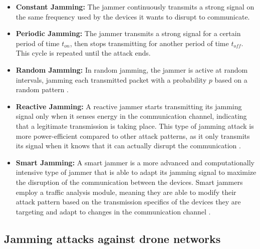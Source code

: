 \documentclass[futureinternet,article,submit,pdftex,moreauthors]{Definitions/mdpi}
\begin{document}
\begin{itemize}
    \item \textbf{Constant Jamming:} The jammer continuously transmits a strong signal on the same frequency used by the devices it wants to disrupt to communicate. 
    \item \textbf{Periodic Jamming:} The jammer transmits a strong signal for a certain period of time \(t_{on}\), then stops transmitting for another period of time \(t_{off}\). This cycle is repeated until the attack ends.
    \item \textbf{Random Jamming:} In random jamming, the jammer is active at random intervals, jamming each transmitted packet with a probability 
    \(p\) based on a random pattern \cite{VANETsAI-Lyamin}. 
    \item \textbf{Reactive Jamming:} A reactive jammer starts transmitting its jamming signal only when it senses energy in the communication channel, 
    indicating that a legitimate transmission is taking place. This type of jamming attack is more power-efficient compared to other 
    attack patterns, as it only transmits its signal when it knows that it can actually disrupt the communication \cite{MLMisbehavior5GBoualouache}.
    \item \textbf{Smart Jamming:} A smart jammer is a more advanced and computationally intensive type of jammer that is able to adapt its jamming signal to 
    maximize the disruption of the communication between the devices. Smart jammers employ a traffic analysis module, meaning they are able to modify their attack pattern based on the 
    transmission specifics of the devices they are targeting and adapt to changes in the communication channel \cite{AntiJammingV2V-Feng}. 
\end{itemize}


\subsection{Jamming attacks against drone networks}\label{JammingDroneNetworks}
\end{document}
